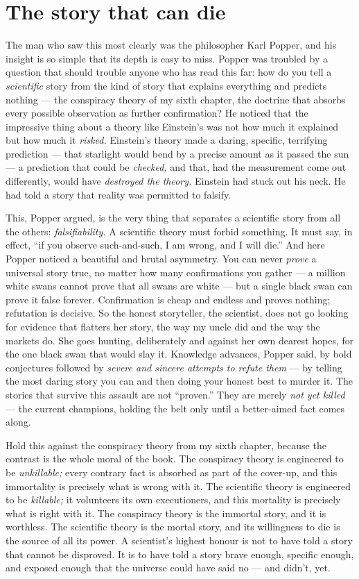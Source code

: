 \section*{The story that can die}

The man who saw this most clearly was the philosopher Karl Popper, and his insight is so simple that its depth is easy to miss. Popper was troubled by a question that should trouble anyone who has read this far: how do you tell a \emph{scientific} story from the kind of story that explains everything and predicts nothing — the conspiracy theory of my sixth chapter, the doctrine that absorbs every possible observation as further confirmation? He noticed that the impressive thing about a theory like Einstein's was not how much it explained but how much it \emph{risked.} Einstein's theory made a daring, specific, terrifying prediction — that starlight would bend by a precise amount as it passed the sun — a prediction that could be \emph{checked,} and that, had the measurement come out differently, would have \emph{destroyed the theory.} Einstein had stuck out his neck. He had told a story that reality was permitted to falsify.

This, Popper argued, is the very thing that separates a scientific story from all the others: \emph{falsifiability.} A scientific theory must forbid something. It must say, in effect, ``if you observe such-and-such, I am wrong, and I will die.'' And here Popper noticed a beautiful and brutal asymmetry. You can never \emph{prove} a universal story true, no matter how many confirmations you gather — a million white swans cannot prove that all swans are white — but a single black swan can prove it false forever. Confirmation is cheap and endless and proves nothing; refutation is decisive. So the honest storyteller, the scientist, does not go looking for evidence that flatters her story, the way my uncle did and the way the markets do. She goes hunting, deliberately and against her own dearest hopes, for the one black swan that would slay it. Knowledge advances, Popper said, by bold conjectures followed by \emph{severe and sincere attempts to refute them} — by telling the most daring story you can and then doing your honest best to murder it. The stories that survive this assault are not ``proven.'' They are merely \emph{not yet killed} — the current champions, holding the belt only until a better-aimed fact comes along.

Hold this against the conspiracy theory from my sixth chapter, because the contrast is the whole moral of the book. The conspiracy theory is engineered to be \emph{unkillable;} every contrary fact is absorbed as part of the cover-up, and this immortality is precisely what is wrong with it. The scientific theory is engineered to be \emph{killable;} it volunteers its own executioners, and this mortality is precisely what is right with it. The conspiracy theory is the immortal story, and it is worthless. The scientific theory is the mortal story, and its willingness to die is the source of all its power. A scientist's highest honour is not to have told a story that cannot be disproved. It is to have told a story brave enough, specific enough, and exposed enough that the universe could have said no — and didn't, yet.

